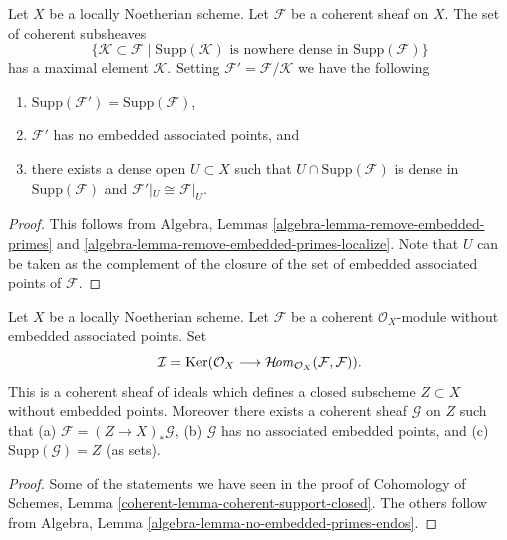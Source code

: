 \begin{lemma}
\label{lemma-remove-embedded-points}
Let $X$ be a locally Noetherian scheme.
Let $\mathcal{F}$ be a coherent sheaf on $X$.
The set of coherent subsheaves
$$
\{
\mathcal{K} \subset \mathcal{F}
\mid
\text{Supp}(\mathcal{K})\text{ is nowhere dense in }\text{Supp}(\mathcal{F})
\}
$$
has a maximal element $\mathcal{K}$.
Setting $\mathcal{F}' = \mathcal{F}/\mathcal{K}$ we have the
following
\begin{enumerate}
\item $\text{Supp}(\mathcal{F}') = \text{Supp}(\mathcal{F})$,
\item $\mathcal{F}'$ has no embedded associated points, and
\item there exists a dense open $U \subset X$ such that
$U \cap \text{Supp}(\mathcal{F})$ is dense in $\text{Supp}(\mathcal{F})$
and $\mathcal{F}'|_U \cong \mathcal{F}|_U$.
\end{enumerate}
\end{lemma}

\begin{proof}
This follows from
Algebra, Lemmas \ref{algebra-lemma-remove-embedded-primes} and
\ref{algebra-lemma-remove-embedded-primes-localize}.
Note that $U$ can be taken as the complement of the closure
of the set of embedded associated points of $\mathcal{F}$.
\end{proof}

\begin{lemma}
\label{lemma-no-embedded-points-endos}
Let $X$ be a locally Noetherian scheme.
Let $\mathcal{F}$ be a coherent $\mathcal{O}_X$-module
without embedded associated points. Set
$$
\mathcal{I}
=
\mathop{\mathrm{Ker}}(\mathcal{O}_X
\longrightarrow
\mathop{\mathcal{H}\!\mathit{om}}\nolimits_{\mathcal{O}_X}(\mathcal{F}, \mathcal{F})).
$$
This is a coherent sheaf of ideals which defines a closed
subscheme $Z \subset X$ without embedded points. Moreover
there exists a coherent sheaf $\mathcal{G}$ on $Z$
such that (a) $\mathcal{F} = (Z \to X)_*\mathcal{G}$,
(b) $\mathcal{G}$ has no associated embedded points, and
(c) $\text{Supp}(\mathcal{G}) = Z$ (as sets).
\end{lemma}

\begin{proof}
Some of the statements we have seen in the proof of
Cohomology of Schemes, Lemma \ref{coherent-lemma-coherent-support-closed}.
The others follow from
Algebra, Lemma \ref{algebra-lemma-no-embedded-primes-endos}.
\end{proof}



